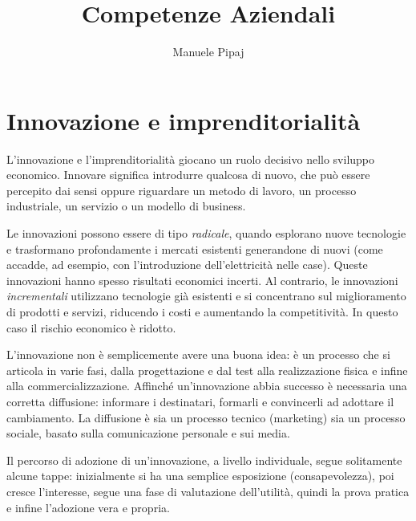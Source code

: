 \documentclass[12pt]{article}
\title{Competenze Aziendali}
\author{Manuele Pipaj}
\date{}
\begin{document}
\maketitle

\section{Innovazione e imprenditorialità}
L’innovazione e l’imprenditorialità giocano un ruolo decisivo nello sviluppo economico.  
Innovare significa introdurre qualcosa di nuovo, che può essere percepito dai sensi oppure riguardare un metodo di lavoro, un processo industriale, un servizio o un modello di business.  

Le innovazioni possono essere di tipo \emph{radicale}, quando esplorano nuove tecnologie e trasformano profondamente i mercati esistenti generandone di nuovi (come accadde, ad esempio, con l’introduzione dell’elettricità nelle case). Queste innovazioni hanno spesso risultati economici incerti.  
Al contrario, le innovazioni \emph{incrementali} utilizzano tecnologie già esistenti e si concentrano sul miglioramento di prodotti e servizi, riducendo i costi e aumentando la competitività. In questo caso il rischio economico è ridotto.

\medskip

L’innovazione non è semplicemente avere una buona idea: è un processo che si articola in varie fasi, dalla progettazione e dal test alla realizzazione fisica e infine alla commercializzazione.  
Affinché un’innovazione abbia successo è necessaria una corretta diffusione: informare i destinatari, formarli e convincerli ad adottare il cambiamento. La diffusione è sia un processo tecnico (marketing) sia un processo sociale, basato sulla comunicazione personale e sui media.

Il percorso di adozione di un’innovazione, a livello individuale, segue solitamente alcune tappe: inizialmente si ha una semplice esposizione (consapevolezza), poi cresce l’interesse, segue una fase di valutazione dell’utilità, quindi la prova pratica e infine l’adozione vera e propria.  
\end{document}
